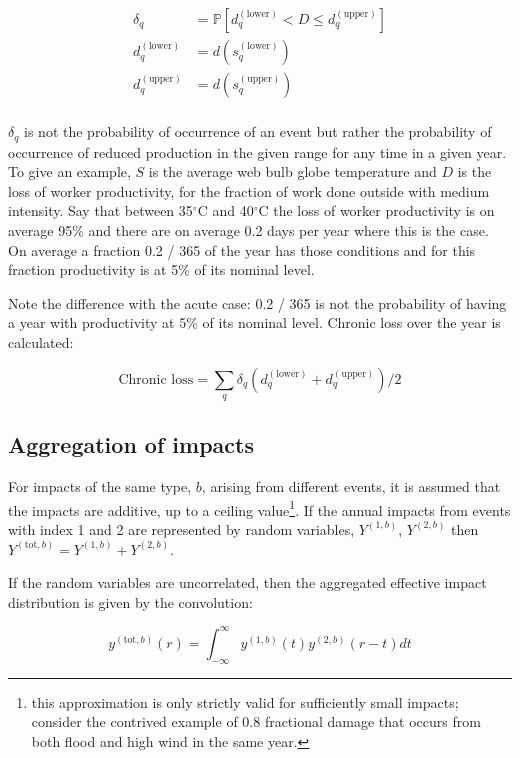 \documentclass[a4paper,11pt]{extarticle} %
\theoremstyle{definition}
\begin{document}
\begin{align*}
    \label{Eq:Chronic2}
    \delta_q &= \mathbb{P} \left[ d^{(\text{lower})}_q < D \le d^{(\text{upper})}_q \right] \\
    d^{(\text{lower})}_q &= d(s^{(\text{lower})}_q) \\
    d^{(\text{upper})}_q &= d(s^{(\text{upper})}_q) \\
\end{align*}

$\delta_q$ is not the probability of occurrence of an event but rather the probability of occurrence of reduced production in the given range for any time in a given year. To give an example, $S$ is the average web bulb globe temperature and $D$ is the loss of worker productivity, for the fraction of work done outside with medium intensity. Say that between 35$^\circ$C and 40$^\circ$C the loss of worker productivity is on average 95\% and there are on average 0.2 days per year where this is the case. On average a fraction 0.2 / 365 of the year has those conditions and for this fraction productivity is at 5\% of its nominal level.

Note the difference with the acute case: 0.2 / 365 is not the probability of having a year with productivity at 5\% of its nominal level. Chronic loss over the year is calculated:

\begin{equation}
    \label{Eq:Chronic3}
    \text{Chronic loss} = \sum_q \delta_q \left( d^{(\text{lower})}_q + d^{(\text{upper})}_q \right) / 2
\end{equation}


\subsection{Aggregation of impacts}
For impacts of the same type, $b$, arising from different events, it is assumed that the impacts are additive, up to a ceiling value\footnote{this approximation is only strictly valid for sufficiently small impacts; consider the contrived example of 0.8 fractional damage that occurs from both flood and high wind in the same year.}. If the annual impacts from events with index 1 and 2 are represented by random variables, $Y^{(1,b)}$, $Y^{(2,b)}$ then $Y^{(\text{tot}, b)} = Y^{(1,b)} + Y^{(2,b)}$.

If the random variables are uncorrelated, then the aggregated effective impact distribution is given by the convolution:

\begin{equation}
    \label{Eq:sampling}
    y^{(\text{tot}, b)}(r) = \int^{\infty}_{-\infty} y^{(1, b)}(t) y^{(2, b)}(r - t) dt
\end{equation}
\end{document}
